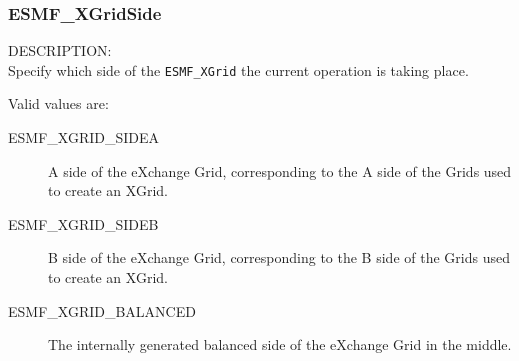 


\subsubsection{ESMF\_XGridSide}
\label{opt:xgridoptions}
{\sf DESCRIPTION:\\}  
Specify which side of the {\tt ESMF\_XGrid} the current operation is taking place.

Valid values are:
\begin{description}
\item [ESMF\_XGRID\_SIDEA]
  A side of the eXchange Grid, corresponding to the A side of the Grids used to create an XGrid.
\item [ESMF\_XGRID\_SIDEB]
  B side of the eXchange Grid, corresponding to the B side of the Grids used to create an XGrid.
\item [ESMF\_XGRID\_BALANCED]
  The internally generated balanced side of the eXchange Grid in the middle.

\end{description}


